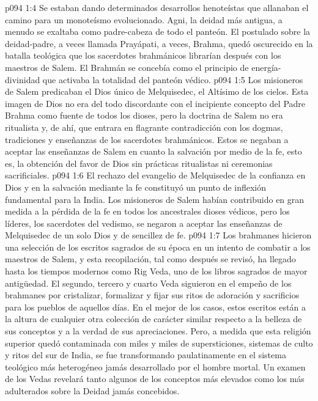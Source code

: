 \vs p094 1:4 Se estaban dando determinados desarrollos henoteístas que allanaban el camino para un monoteísmo evolucionado. Agni, la deidad más antigua, a menudo se exaltaba como padre\hyp{}cabeza de todo el panteón. El postulado sobre la deidad\hyp{}padre, a veces llamada Prayápati, a veces, Brahma, quedó oscurecido en la batalla teológica que los sacerdotes brahmánicos librarían después con los maestros de Salem. El Brahmán se concebía como el principio de energía\hyp{}divinidad que activaba la totalidad del panteón védico.
\vs p094 1:5 \pc Los misioneros de Salem predicaban el Dios único de Melquisedec, el Altísimo de los cielos. Esta imagen de Dios no era del todo discordante con el incipiente concepto del Padre Brahma como fuente de todos los dioses, pero la doctrina de Salem no era ritualista y, de ahí, que entrara en flagrante contradicción con los dogmas, tradiciones y enseñanzas de los sacerdotes brahmánicos. Estos se negaban a aceptar las enseñanzas de Salem en cuanto la salvación por medio de la fe, esto es, la obtención del favor de Dios sin prácticas ritualistas ni ceremonias sacrificiales.
\vs p094 1:6 \pc El rechazo del evangelio de Melquisedec de la confianza en Dios y en la salvación mediante la fe constituyó un punto de inflexión fundamental para la India. Los misioneros de Salem habían contribuido en gran medida a la pérdida de la fe en todos los ancestrales dioses védicos, pero los líderes, los sacerdotes del vedismo, se negaron a aceptar las enseñanzas de Melquisedec de un solo Dios y de sencillez de fe.
\vs p094 1:7 Los brahmanes hicieron una selección de los escritos sagrados de su época en un intento de combatir a los maestros de Salem, y esta recopilación, tal como después se revisó, ha llegado hasta los tiempos modernos como Rig Veda, uno de los libros sagrados de mayor antigüedad. El segundo, tercero y cuarto Veda siguieron en el empeño de los brahmanes por cristalizar, formalizar y fijar sus ritos de adoración y sacrificios para los pueblos de aquellos días. En el mejor de los casos, estos escritos están a la altura de cualquier otra colección de carácter similar respecto a la belleza de sus conceptos y a la verdad de sus apreciaciones. Pero, a medida que esta religión superior quedó contaminada con miles y miles de supersticiones, sistemas de culto y ritos del sur de India, se fue transformando paulatinamente en el sistema teológico más heterogéneo jamás desarrollado por el hombre mortal. Un examen de los Vedas revelará tanto algunos de los conceptos más elevados como los más adulterados sobre la Deidad jamás concebidos.
